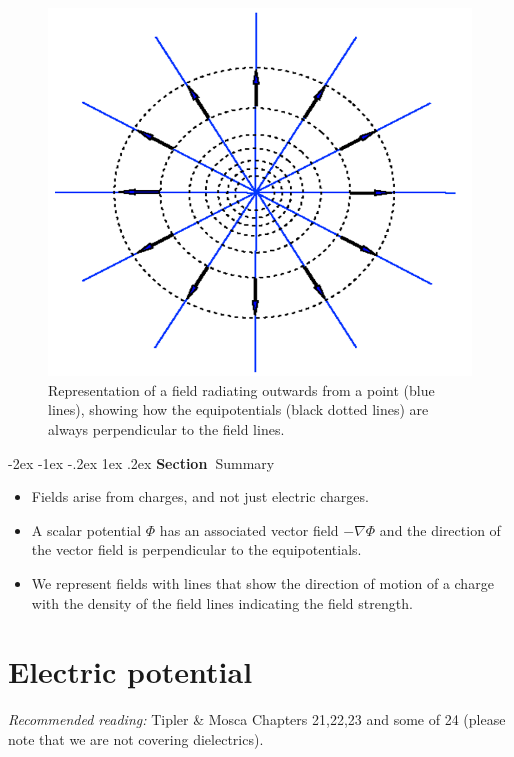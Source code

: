 \documentclass[
]{book}
\makeatletter
\renewcommand\section{%
\@startsection{section}{1}{\z@}%
              {-2ex \@plus -1ex \@minus -.2ex}%
              {1ex \@plus .2ex}%
              {\sffamily\bfseries\large\noindent Section~}}
\makeatother
\begin{document}
\begin{figure}

{\centering \includegraphics[width=0.7\linewidth]{Figures/equipotentials} 

}

\caption{Representation of a field radiating outwards from a point (blue lines), showing how the equipotentials (black dotted lines) are always perpendicular to the field lines.}\label{fig:equipotentials}
\end{figure}

\hypertarget{summary}{%
\section{Summary}\label{summary}}

\begin{itemize}
\item
  Fields arise from charges, and not just electric charges.
\item
  A scalar potential \(\Phi\) has an associated vector field
  \(-\nabla \Phi\) and the direction of the vector field is
  perpendicular to the equipotentials.
\item
  We represent fields with lines that show the direction of motion of
  a charge with the density of the field lines indicating the field
  strength.
\end{itemize}

\hypertarget{electric-potential}{%
\chapter{Electric potential}\label{electric-potential}}

\emph{Recommended reading:} Tipler \& Mosca Chapters 21,22,23 and some of 24
(please note that we are not covering dielectrics).
\end{document}
